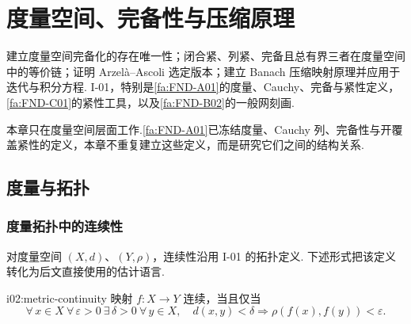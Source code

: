 \chapter{度量空间、完备性与压缩原理}\label{chap:I-02}
\FAChapterOpening
{建立度量空间完备化的存在唯一性；闭合紧、列紧、完备且总有界三者在度量空间中的等价链；证明 Arzelà--Ascoli 选定版本；建立 Banach 压缩映射原理并应用于迭代与积分方程.}
{I-01，特别是\autoref{fa:FND-A01}的度量、Cauchy、完备与紧性定义，\autoref{fa:FND-C01}的紧性工具，以及\autoref{fa:FND-B02}的一般网刻画.}
{\centering
{}}

本章只在度量空间层面工作.\autoref{fa:FND-A01}已冻结度量、Cauchy 列、完备性与开覆盖紧性的定义，本章不重复建立这些定义，而是研究它们之间的结构关系.

\section{度量与拓扑}\label{sec:i02-metric}

\subsection{度量拓扑中的连续性}

对度量空间 \(\displaystyle (X,d)\)、\(\displaystyle (Y,\rho)\)，连续性沿用 I-01 的拓扑定义. 下述形式把该定义转化为后文直接使用的估计语言.

\begin{FAProposition}{i02:metric-continuity}
映射 \(\displaystyle f:X\to Y\) 连续，当且仅当
\[
\forall\,x\in X\ \forall\,\varepsilon>0\ \exists\,\delta>0\ \forall\,y\in X,
\quad d(x,y)<\delta\Longrightarrow \rho(f(x),f(y))<\varepsilon.
\]
\end{FAProposition}

